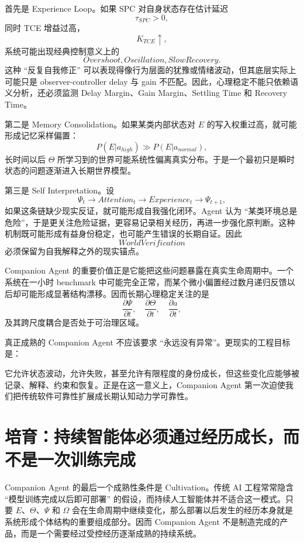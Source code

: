 首先是 Experience Loop。如果 SPC 对自身状态存在估计延迟
\[
\tau_{SPC}>0,
\]
同时 TCE 增益过高，
\[
K_{TCE}\uparrow,
\]
系统可能出现经典控制意义上的
\[
Overshoot,
Oscillation,
SlowRecovery.
\]
这种 ``反复自我修正'' 可以表现得像行为层面的犹豫或情绪波动，但其底层实际上可能只是 observer-controller delay 与 gain 不匹配。因此，心理稳定不能只依赖语义分析，还必须监测 Delay Margin、Gain Margin、Settling Time 和 Recovery Time。

第二是 Memory Consolidation。如果某类内部状态对 $E$ 的写入权重过高，就可能形成记忆采样偏置：
\[
P(E|a_{high})
\gg
P(E|a_{normal}),
\]
长时间以后 $\Theta$ 所学习到的世界可能系统性偏离真实分布。于是一个最初只是瞬时状态的问题逐渐进入长期世界模型。

第三是 Self Interpretation。设
\[
\Psi_t
\rightarrow
Attention_t
\rightarrow
Experience_t
\rightarrow
\Psi_{t+1},
\]
如果这条链缺少现实反证，就可能形成自我强化闭环。Agent 认为 ``某类环境总是危险''，于是更关注危险证据，更容易记录相关经历，再进一步强化原判断。这种机制既可能形成有益身份稳定，也可能产生错误的长期自证。因此
\[
WorldVerification
\]
必须保留为自我解释之外的现实锚点。

Companion Agent 的重要价值正是它能把这些问题暴露在真实生命周期中。一个系统在一小时 benchmark 中可能完全正常，而某个微小偏置经过数月递归反馈以后却可能形成显著结构漂移。因而长期心理稳定关注的是
\[
\frac{\partial \Psi}{\partial t},
\quad
\frac{\partial \Theta}{\partial t},
\quad
\frac{\partial a}{\partial t},
\]
及其跨尺度耦合是否处于可治理区域。

真正成熟的 Companion Agent 不应该要求 ``永远没有异常''。更现实的工程目标是：
\begin{statementbox}
\centering
{}
\end{statementbox}
它允许状态波动，允许失败，甚至允许有限程度的身份成长，但这些变化应能够被记录、解释、约束和恢复。正是在这一意义上，Companion Agent 第一次迫使我们把传统软件可靠性扩展成长期认知动力学可靠性。

\section{培育：持续智能体必须通过经历成长，而不是一次训练完成}

Companion Agent 的最后一个成熟性条件是 Cultivation。传统 AI 工程常常隐含 ``模型训练完成以后即可部署'' 的假设，而持续人工智能体并不适合这一模式。只要 $E$、$\Theta$、$\Psi$ 和 $\Omega$ 会在生命周期中继续变化，那么部署以后发生的经历本身就是系统形成个体结构的重要组成部分。因而 Companion Agent 不是制造完成的产品，而是一个需要经过受控经历逐渐成熟的持续系统。

